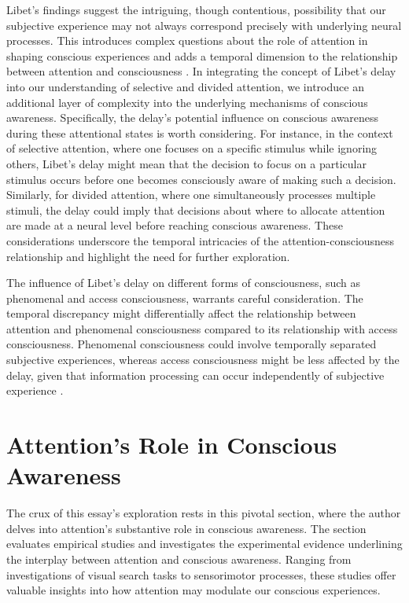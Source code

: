 \documentclass[10pt]{article}
\begin{document}
\begin{sloppypar}
  Libet’s findings suggest the intriguing, though contentious, possibility that our subjective experience may not always correspond precisely with underlying neural processes. This introduces complex questions about the role of attention in shaping conscious experiences and adds a temporal dimension to the relationship between attention and consciousness \citep{dijksterhuis_goals_2010}. In integrating the concept of Libet’s delay into our understanding of selective and divided attention, we introduce an additional layer of complexity into the underlying mechanisms of conscious awareness. Specifically, the delay’s potential influence on conscious awareness during these attentional states is worth considering. For instance, in the context of selective attention, where one focuses on a specific stimulus while ignoring others, Libet’s delay might mean that the decision to focus on a particular stimulus occurs before one becomes consciously aware of making such a decision. Similarly, for divided attention, where one simultaneously processes multiple stimuli, the delay could imply that decisions about where to allocate attention are made at a neural level before reaching conscious awareness. These considerations underscore the temporal intricacies of the attention-consciousness relationship and highlight the need for further exploration.

  The influence of Libet’s delay on different forms of consciousness, such as phenomenal and access consciousness, warrants careful consideration. The temporal discrepancy might differentially affect the relationship between attention and phenomenal consciousness compared to its relationship with access consciousness. Phenomenal consciousness could involve temporally separated subjective experiences, whereas access consciousness might be less affected by the delay, given that information processing can occur independently of subjective experience \citep{dijksterhuis_goals_2010, kozuch_gorillas_2018}.

  \section{Attention’s Role in Conscious Awareness}
  \label{sec:evidence}

  The crux of this essay’s exploration rests in this pivotal section, where the author delves into attention’s substantive role in conscious awareness. The section evaluates empirical studies and investigates the experimental evidence underlining the interplay between attention and conscious awareness. Ranging from investigations of visual search tasks to sensorimotor processes, these studies offer valuable insights into how attention may modulate our conscious experiences.


\end{sloppypar}
\end{document}
